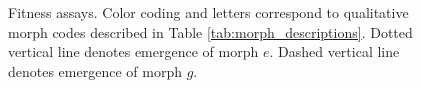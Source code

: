 \begin{figure}





\caption{ Fitness assays.
Color coding and letters correspond to qualitative morph codes described in Table \ref{tab:morph_descriptions}.
Dotted vertical line denotes emergence of morph $e$.
Dashed vertical line denotes emergence of morph $g$. }
\label{fig:fitness}

\end{figure}
